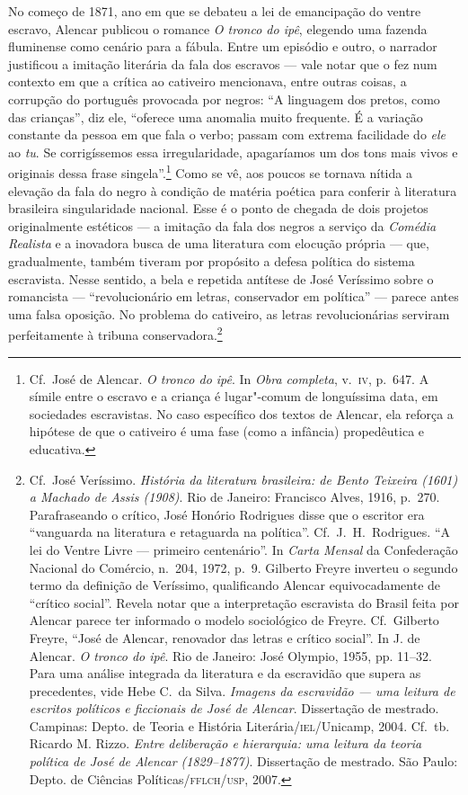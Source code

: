 No começo de 1871, ano em que se debateu a lei de emancipação do ventre
escravo, Alencar publicou o romance \textit{O tronco do ipê}, elegendo
uma fazenda fluminense como cenário para a fábula. Entre um episódio e
outro, o narrador justificou a imitação literária da fala dos escravos
--- vale notar que o fez num contexto em que a crítica ao cativeiro
mencionava, entre outras coisas, a corrupção do português provocada por
negros: ``A linguagem dos pretos, como das crianças'', diz ele, ``oferece
uma anomalia muito frequente. É a variação constante da pessoa em que
fala o verbo; passam com extrema facilidade do \textit{ele} ao
\textit{tu}. Se corrigíssemos essa irregularidade, apagaríamos um dos
tons mais vivos e originais dessa frase singela''.\footnote{ Cf.~José de
Alencar. \textit{O tronco do ipê}. In \textit{Obra completa},
v.~\textsc{iv}, p.~647. A símile entre o escravo e a criança é lugar"-comum 
de longuíssima data, em sociedades escravistas. No caso específico dos
textos de Alencar, ela reforça a hipótese de que o cativeiro é uma fase
(como a infância) propedêutica e educativa.} Como se vê, aos poucos
se tornava nítida a elevação da fala do negro à  condição de matéria
poética para conferir à  literatura brasileira singularidade nacional.
Esse é o ponto de chegada de dois projetos originalmente estéticos --- a
imitação da fala dos negros a serviço da \textit{Comédia Realista} e a inovadora 
busca de uma literatura com elocução própria --- que,
gradualmente, também tiveram por propósito a defesa política do sistema
escravista. Nesse sentido, a bela e repetida antítese de José Veríssimo
sobre o romancista --- ``revolucionário em letras, conservador em
política'' --- parece antes uma falsa oposição. No problema do cativeiro,
as letras revolucionárias serviram perfeitamente à  tribuna
conservadora.\footnote{ Cf.~José Veríssimo. \textit{História da
literatura brasileira: de Bento Teixeira (1601) a Machado de Assis
(1908)}. Rio de Janeiro: Francisco Alves, 1916, p.~270. Parafraseando o
crítico, José Honório Rodrigues disse que o escritor era ``vanguarda na
literatura e retaguarda na política''. Cf.~J.~H.~Rodrigues. ``A lei do
Ventre Livre --- primeiro centenário''. In \textit{Carta Mensal} da
Confederação Nacional do Comércio, n.~204, 1972, p.~9. Gilberto Freyre
inverteu o segundo termo da definição de Veríssimo, qualificando
Alencar equivocadamente de ``crítico social''. Revela notar que a
interpretação escravista do Brasil feita por Alencar parece ter
informado o modelo sociológico de Freyre. Cf.~Gilberto Freyre, ``José de
Alencar, renovador das letras e crítico social''. In J. de Alencar.
\textit{O tronco do ipê}. Rio de Janeiro: José Olympio, 1955, pp.
11--32. Para uma análise integrada da literatura e da escravidão que
supera as precedentes, vide Hebe C.~da Silva. \textit{Imagens da
escravidão --- uma leitura de escritos políticos e ficcionais de José de
Alencar}. Dissertação de mestrado. Campinas: Depto. de Teoria e
História Literária/\textsc{iel}/Unicamp, 2004. Cf.~tb. Ricardo M. Rizzo.
\textit{Entre deliberação e hierarquia: uma leitura da teoria política
de José de Alencar (1829--1877)}. Dissertação de mestrado. São Paulo:
Depto. de Ciências Políticas/\textsc{fflch/usp}, 2007.} 

